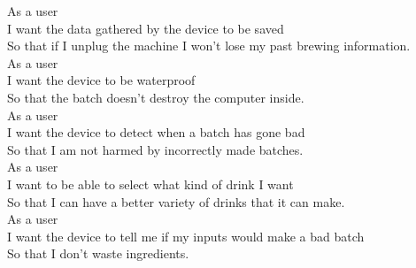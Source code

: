 \documentclass[letterpaper,10pt]{article}
\begin{document}
As a user\\
I want the data gathered by the device to be saved\\
So that if I unplug the machine I won't lose my past brewing information.\\

As a user\\
I want the device to be waterproof\\
So that the batch doesn't destroy the computer inside.\\

As a user\\
I want the device to detect when a batch has gone bad\\
So that I am not harmed by incorrectly made batches.\\

As a user\\
I want to be able to select what kind of drink I want\\
So that I can have a better variety of drinks that it can make.\\

As a user\\
I want the device to tell me if my inputs would make a bad batch\\
So that I don't waste ingredients.\\
\end{document}
